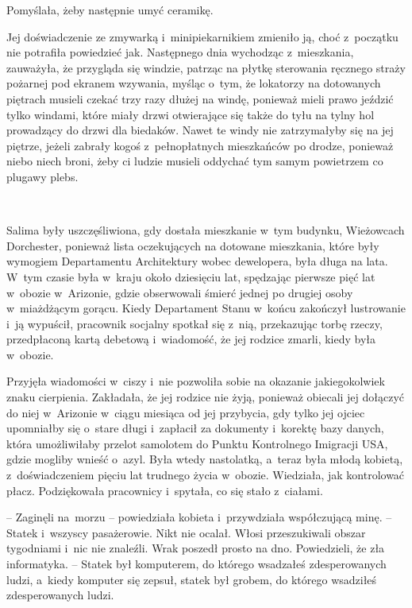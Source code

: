 \documentclass[oneside,polish,11pt,sfheadings]{mwbk}
\begin{document}
Pomyślała, żeby następnie umyć ceramikę.

Jej doświadczenie ze zmywarką i~minipiekarnikiem zmieniło ją, choć z~początku nie potrafiła powiedzieć jak. Następnego dnia wychodząc z~mieszkania, zauważyła, że przygląda się windzie, patrząc na płytkę
sterowania ręcznego straży pożarnej pod ekranem wzywania, myśląc o~tym,
że lokatorzy na dotowanych piętrach musieli czekać trzy razy dłużej na
windę, ponieważ mieli prawo jeździć tylko windami, które miały drzwi
otwierające się także do tyłu na tylny hol prowadzący do drzwi dla
biedaków. Nawet te windy nie zatrzymałyby się na jej piętrze, jeżeli
zabrały kogoś z~pełnopłatnych mieszkańców po drodze, ponieważ niebo
niech broni, żeby ci ludzie musieli oddychać tym samym powietrzem co
plugawy plebs.

~

Salima były uszczęśliwiona, gdy dostała mieszkanie w~tym budynku,
Wieżowcach Dorchester, ponieważ lista oczekujących na dotowane
mieszkania, które były wymogiem Departamentu Architektury wobec
dewelopera, była długa na lata. W~tym czasie była w~kraju około
dziesięciu lat, spędzając pierwsze pięć lat w~obozie w~Arizonie, gdzie
obserwowali śmierć jednej po drugiej osoby w~miażdżącym gorącu. Kiedy
Departament Stanu w~końcu zakończył lustrowanie i~ją wypuścił, pracownik
socjalny spotkał się z~nią, przekazując torbę rzeczy, przedpłaconą kartą
debetową i~wiadomość, że jej rodzice zmarli, kiedy była w~obozie.

Przyjęła wiadomości w~ciszy i~nie pozwoliła sobie na okazanie
jakiegokolwiek znaku cierpienia. Zakładała, że jej rodzice nie żyją,
ponieważ obiecali jej dołączyć do niej w~Arizonie w~ciągu miesiąca od
jej przybycia, gdy tylko jej ojciec upomniałby się o~stare długi i~zapłacił za dokumenty i~korektę bazy danych, która umożliwiłaby przelot
samolotem do Punktu Kontrolnego Imigracji USA, gdzie mogliby wnieść o~azyl. Była wtedy nastolatką, a~teraz była młodą kobietą, z~doświadczeniem pięciu lat trudnego życia w~obozie. Wiedziała, jak
kontrolować płacz. Podziękowała pracownicy i~spytała, co się stało z~ciałami.

-- Zaginęli na~morzu -- powiedziała kobieta i~przywdziała współczującą
minę. -- Statek i~wszyscy pasażerowie. Nikt nie ocalał. Włosi przeszukiwali
obszar tygodniami i~nic nie znaleźli. Wrak poszedł prosto na dno.
Powiedzieli, że zła informatyka. -- Statek był komputerem, do którego
wsadzałeś zdesperowanych ludzi, a~kiedy komputer się zepsuł, statek był
grobem, do którego wsadziłeś zdesperowanych ludzi.
\end{document}
